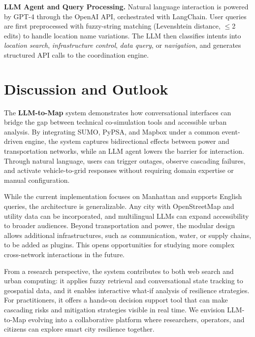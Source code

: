 \documentclass[sigconf,review,nonacm]{acmart}
\begin{document}
\noindent\textbf{LLM Agent and Query Processing.}
Natural language interaction is powered by GPT-4 through the OpenAI API, orchestrated with LangChain. User queries are first preprocessed with fuzzy-string matching (Levenshtein distance, $\leq$2 edits) to handle location name variations. The LLM then classifies intents into \emph{location search}, \emph{infrastructure control}, \emph{data query}, or \emph{navigation}, and generates structured API calls to the coordination engine.

\section{Discussion and Outlook}
The \textbf{LLM-to-Map} system demonstrates how conversational interfaces can bridge the gap between technical co-simulation tools and accessible urban analysis. By integrating SUMO, PyPSA, and Mapbox under a common event-driven engine, the system captures bidirectional effects between power and transportation networks, while an LLM agent lowers the barrier for interaction. Through natural language, users can trigger outages, observe cascading failures, and activate vehicle-to-grid responses without requiring domain expertise or manual configuration.

While the current implementation focuses on Manhattan and supports English queries, the architecture is generalizable. Any city with OpenStreetMap and utility data can be incorporated, and multilingual LLMs can expand accessibility to broader audiences. Beyond transportation and power, the modular design allows additional infrastructures, such as communication, water, or supply chains, to be added as plugins. This opens opportunities for studying more complex cross-network interactions in the future.

From a research perspective, the system contributes to both web search and urban computing: it applies fuzzy retrieval and conversational state tracking to geospatial data, and it enables interactive what-if analysis of resilience strategies. For practitioners, it offers a hands-on decision support tool that can make cascading risks and mitigation strategies visible in real time. We envision LLM-to-Map evolving into a collaborative platform where researchers, operators, and citizens can explore smart city resilience together.



\end{document}
